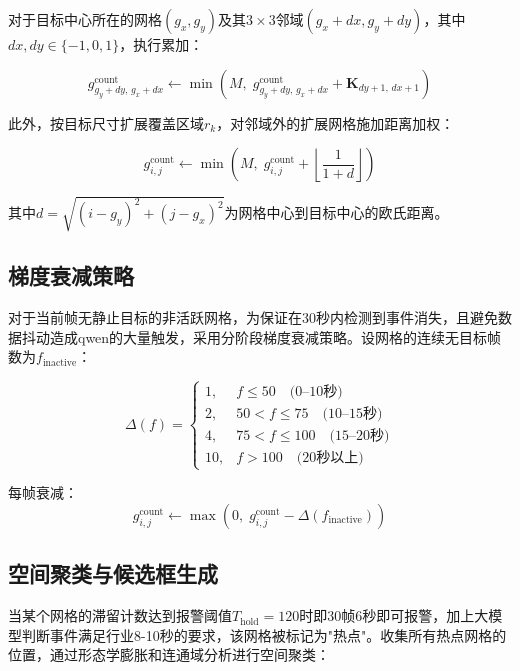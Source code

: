 \documentclass[10.5pt,a4paper,twoside,twocolumn]{ctexart}
\begin{document}
对于目标中心所在的网格$(g_x,g_y)$及其$3\times3$邻域$(g_x+dx, g_y+dy)$，其中$dx,dy\in\{-1,0,1\}$，执行累加：

\begin{equation}
g_{g_y+dy,\,g_x+dx}^{\text{count}} \leftarrow \min\left(M,\; g_{g_y+dy,\,g_x+dx}^{\text{count}} + \mathbf{K}_{dy+1,\,dx+1}\right)
\end{equation}

此外，按目标尺寸扩展覆盖区域$r_k$，对邻域外的扩展网格施加距离加权：

\begin{equation}
g_{i,j}^{\text{count}} \leftarrow \min\left(M,\; g_{i,j}^{\text{count}} + \left\lfloor\frac{1}{1+d}\right\rfloor\right)
\end{equation}

其中$d = \sqrt{(i-g_y)^2 + (j-g_x)^2}$为网格中心到目标中心的欧氏距离。

\subsection{梯度衰减策略}

对于当前帧无静止目标的非活跃网格，为保证在30秒内检测到事件消失，且避免数据抖动造成qwen的大量触发，采用分阶段梯度衰减策略。设网格的连续无目标帧数为$f_{\text{inactive}}$：

\begin{equation}
\Delta(f) = \begin{cases}
1, & f \leq 50 \quad\text{(0--10秒)}\\
2, & 50 < f \leq 75 \quad\text{(10--15秒)}\\
4, & 75 < f \leq 100 \quad\text{(15--20秒)}\\
10, & f > 100 \quad\text{(20秒以上)}
\end{cases}
\end{equation}

每帧衰减：
\begin{equation}
g_{i,j}^{\text{count}} \leftarrow \max(0,\; g_{i,j}^{\text{count}} - \Delta(f_{\text{inactive}}))
\end{equation}

\subsection{空间聚类与候选框生成}

当某个网格的滞留计数达到报警阈值$T_{\text{hold}}=120$时即30帧6秒即可报警，加上大模型判断事件满足行业8-10秒的要求，该网格被标记为"热点"。收集所有热点网格的位置，通过形态学膨胀和连通域分析进行空间聚类：
\end{document}
